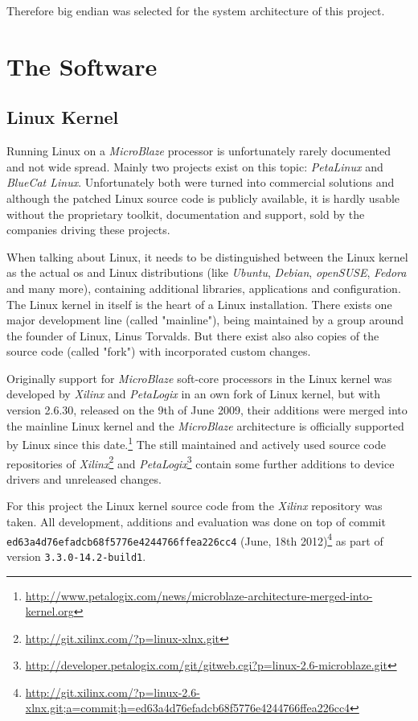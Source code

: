 Therefore big endian was selected for the system architecture of this project.

\section{The Software}

\subsection{Linux Kernel}

Running Linux on a \textit{MicroBlaze} processor is unfortunately rarely documented and not wide spread. Mainly two projects exist on this topic: \textit{PetaLinux} and \textit{BlueCat Linux}. Unfortunately both were turned into commercial solutions and although the patched Linux source code is publicly available, it is hardly usable without the proprietary toolkit, documentation and support, sold by the companies driving these projects.

When talking about Linux, it needs to be distinguished between the Linux kernel as the actual \gls{os} and Linux distributions (like \textit{Ubuntu}, \textit{Debian}, \textit{openSUSE}, \textit{Fedora} and many more), containing additional libraries, applications and configuration. The Linux kernel in itself is the heart of a Linux installation. There exists one major development line (called "mainline"), being maintained by a group around the founder of Linux, Linus Torvalds. But there exist also also copies of the source code (called "fork") with incorporated custom changes.

Originally support for \textit{MicroBlaze} soft-core processors in the Linux kernel was developed by \textit{Xilinx} and \textit{PetaLogix} in an own fork of Linux kernel, but with version 2.6.30, released on the 9th of June 2009, their additions were merged into the mainline Linux kernel and the \textit{MicroBlaze} architecture is officially supported by Linux since this date.\footnote{\url{http://www.petalogix.com/news/microblaze-architecture-merged-into-kernel.org}} The still maintained and actively used source code repositories of \textit{Xilinx}\footnote{\url{http://git.xilinx.com/?p=linux-xlnx.git}} and \textit{PetaLogix}\footnote{\url{http://developer.petalogix.com/git/gitweb.cgi?p=linux-2.6-microblaze.git}} contain some further additions to device drivers and unreleased changes.

For this project the Linux kernel source code from the \textit{Xilinx} repository was taken. All development, additions and evaluation was done on top of commit \texttt{ed63a4d76efadcb68f5776e4244766ffea226cc4} (June, 18th 2012)\footnote{\url{http://git.xilinx.com/?p=linux-2.6-xlnx.git;a=commit;h=ed63a4d76efadcb68f5776e4244766ffea226cc4}} as part of version \texttt{3.3.0-14.2-build1}.

